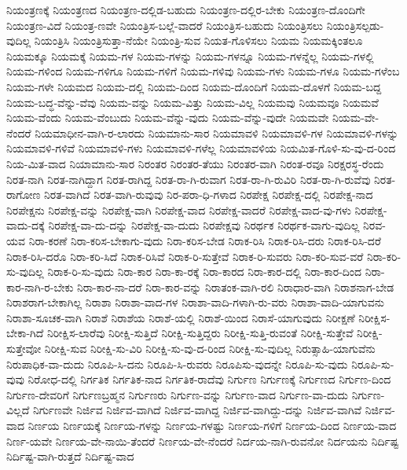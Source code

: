 {ನಿಯಂತ್ರಣಕ್ಕೆ
ನಿಯಂತ್ರಣದ
ನಿಯಂತ್ರಣ-ದಲ್ಲಿಡ-ಬಹುದು
ನಿಯಂತ್ರಣ-ದಲ್ಲಿರ-ಬೇಕು
ನಿಯಂತ್ರಣ-ದೊಂದಿಗೇ
ನಿಯಂತ್ರಣ-ವಿದೆ
ನಿಯಂತ್ರ-ಣವೇ
ನಿಯಂತ್ರಿಸ-ಬಲ್ಲೆ-ವಾದರೆ
ನಿಯಂತ್ರಿಸ-ಬಹುದು
ನಿಯಂತ್ರಿಸಲು
ನಿಯಂತ್ರಿಸಲ್ಪಡು-ವುದಿಲ್ಲ
ನಿಯಂತ್ರಿಸಿ
ನಿಯಂತ್ರಿಸುತ್ತಾ-ನೆಯೇ
ನಿಯಂತ್ರಿ-ಸುವ
ನಿಯತ-ಗೊಳಿಸಲು
ನಿಯಮ
ನಿಯಮಕ್ಕಿಂತಲೂ
ನಿಯಮಕ್ಕೂ
ನಿಯಮಕ್ಕೆ
ನಿಯಮ-ಗಳ
ನಿಯಮ-ಗಳನ್ನು
ನಿಯಮ-ಗಳನ್ನೂ
ನಿಯಮ-ಗಳನ್ನೆಲ್ಲ
ನಿಯಮ-ಗಳಲ್ಲಿ
ನಿಯಮ-ಗಳಿಂದ
ನಿಯಮ-ಗಳಿಗೂ
ನಿಯಮ-ಗಳಿಗೆ
ನಿಯಮ-ಗಳಿವು
ನಿಯಮ-ಗಳು
ನಿಯಮ-ಗಳೂ
ನಿಯಮ-ಗಳೆಂಬ
ನಿಯಮ-ಗಳೇ
ನಿಯಮದ
ನಿಯಮ-ದಲ್ಲಿ
ನಿಯಮ-ದಿಂದ
ನಿಯಮ-ದೊಂದಿಗೆ
ನಿಯಮ-ದೊಳಗೆ
ನಿಯಮ-ಬದ್ದ
ನಿಯಮ-ಬದ್ಧ-ವೆನ್ನು-ವೆವು
ನಿಯಮ-ವನ್ನು
ನಿಯಮ-ವಿತ್ತು
ನಿಯಮ-ವಿಲ್ಲ
ನಿಯಮವು
ನಿಯಮವೂ
ನಿಯಮವೆ
ನಿಯಮ-ವೆಂದು
ನಿಯಮ-ವೆಂಬುದು
ನಿಯಮ-ವೆನ್ನು-ವುದು
ನಿಯಮ-ವೆನ್ನು-ವುದೇ
ನಿಯಮವೇ
ನಿಯಮ-ವೇ-ನೆಂದರೆ
ನಿಯಮಾಧೀನ-ವಾಗಿ-ರ-ಲಾರದು
ನಿಯಮಾನು-ಸಾರ
ನಿಯಮಾವಳಿ
ನಿಯಮಾವಳಿ-ಗಳ
ನಿಯಮಾವಳಿ-ಗಳನ್ನು
ನಿಯಮಾವಳಿ-ಗಳಿವೆ
ನಿಯಮಾವಳಿ-ಗಳು
ನಿಯಮಾವಳಿ-ಗಳೆಲ್ಲ
ನಿಯಮಾವಳಿಯ
ನಿಯಮಿತ-ಗೊಳಿ-ಸು-ವು-ದ-ರಿಂದ
ನಿಯ-ಮಿತ-ವಾದ
ನಿಯಾಮಾನು-ಸಾರ
ನಿರಂತರ
ನಿರಂತರ-ತೆಯು
ನಿರಂತರ-ವಾಗಿ
ನಿರಂತ-ರವೂ
ನಿರಕ್ಷರಸ್ಥ-ರೆಂದು
ನಿರತ-ನಾಗಿ
ನಿರತ-ನಾಗಿದ್ದಾಗ
ನಿರತ-ರಾಗಿದ್ದ
ನಿರತ-ರಾ-ಗಿ-ರುವಾಗ
ನಿರತ-ರಾ-ಗಿ-ರುವಿರಿ
ನಿರತ-ರಾ-ಗಿ-ರುವೆವು
ನಿರತ-ರಾಗೋಣ
ನಿರತ-ವಾಗಿದೆ
ನಿರತ-ವಾಗಿ-ರುವುವು
ನಿರ-ಪರಾ-ಧಿ-ಗಳಾದ
ನಿರಪೇಕ್ಷ
ನಿರಪೇಕ್ಷ-ದಲ್ಲಿ
ನಿರಪೇಕ್ಷ-ನಾದ
ನಿರಪೇಕ್ಷನು
ನಿರಪೇಕ್ಷ-ವನ್ನು
ನಿರಪೇಕ್ಷ-ವಾಗಿ
ನಿರಪೇಕ್ಷ-ವಾದ
ನಿರಪೇಕ್ಷ-ವಾದರೆ
ನಿರಪೇಕ್ಷ-ವಾದ-ವು-ಗಳು
ನಿರಪೇಕ್ಷ-ವಾದು-ದಕ್ಕೆ
ನಿರಪೇಕ್ಷ-ವಾ-ದು-ದನ್ನು
ನಿರಪೇಕ್ಷ-ವಾ-ದುದು
ನಿರಪೇಕ್ಷವು
ನಿರರ್ಥಕ
ನಿರರ್ಥಕ-ವಾಗು-ವುದಿಲ್ಲ
ನಿರವ-ಯವ
ನಿರಾ-ಕರಣೆ
ನಿರಾ-ಕರಿಸ-ಬೇಕಾಗು-ವುದು
ನಿರಾ-ಕರಿಸ-ಬೇಡ
ನಿರಾಕ-ರಿಸಿ
ನಿರಾಕ-ರಿಸಿ-ದರು
ನಿರಾಕ-ರಿಸಿ-ದರೆ
ನಿರಾಕ-ರಿಸಿ-ದರೊ
ನಿರಾ-ಕರಿ-ಸಿದೆ
ನಿರಾಕ-ರಿಸಿವೆ
ನಿರಾಕ-ರಿ-ಸುತ್ತೇವೆ
ನಿರಾಕ-ರಿ-ಸುವರು
ನಿರಾ-ಕರಿ-ಸುವ-ವರೆ
ನಿರಾ-ಕರಿ-ಸು-ವುದಿಲ್ಲ
ನಿರಾಕ-ರಿ-ಸು-ವುದು
ನಿರಾ-ಕಾರ
ನಿರಾ-ಕಾ-ರಕ್ಕೆ
ನಿರಾ-ಕಾರದ
ನಿರಾ-ಕಾರ-ದಲ್ಲಿ
ನಿರಾ-ಕಾರ-ದಿಂದ
ನಿರಾ-ಕಾರ-ನಾಗಿ-ರ-ಬೇಕು
ನಿರಾ-ಕಾರ-ನಾ-ದರೆ
ನಿರಾ-ಕಾರ-ವನ್ನು
ನಿರಾತಂಕ-ವಾಗಿ-ರಲಿ
ನಿರಾಧಾರ-ವಾಗಿ
ನಿರಾಶನಾಗ-ಬೇಡ
ನಿರಾಶರಾಗ-ಬೇಕಾಗಿಲ್ಲ
ನಿರಾಶಾ
ನಿರಾಶಾ-ವಾದ-ಗಳ
ನಿರಾಶಾ-ವಾದಿ-ಗಳಾಗಿ-ರು-ವರು
ನಿರಾಶಾ-ವಾದಿ-ಯಾಗುವನು
ನಿರಾಶಾ-ಸೂಚಕ-ವಾಗಿ
ನಿರಾಶೆ
ನಿರಾಶೆಯ
ನಿರಾಶೆ-ಯಲ್ಲಿ
ನಿರಾಶೆ-ಯಿಂದ
ನಿರಾಸೆ-ಯಾಗುವುದು
ನಿರೀಕ್ಷಣೆ
ನಿರೀಕ್ಷಿಸ-ಬೇಕಾ-ಗಿದೆ
ನಿರೀಕ್ಷಿಸ-ಲಾರೆವು
ನಿರೀಕ್ಷಿ-ಸುತ್ತಿದೆ
ನಿರೀಕ್ಷಿ-ಸುತ್ತಿದ್ದರು
ನಿರೀಕ್ಷಿ-ಸುತ್ತಿ-ರುವಂತೆ
ನಿರೀಕ್ಷಿ-ಸುತ್ತೇವೆ
ನಿರೀಕ್ಷಿ-ಸುತ್ತೇವೋ
ನಿರೀಕ್ಷಿ-ಸುವ
ನಿರೀಕ್ಷಿ-ಸು-ವಿರಿ
ನಿರೀಕ್ಷಿ-ಸು-ವು-ದ-ರಿಂದ
ನಿರೀಕ್ಷಿ-ಸು-ವುದಿಲ್ಲ
ನಿರುತ್ಸಾಹಿ-ಯಾಗುವೆನು
ನಿರುಪಾಧಿಕ-ವಾ-ದುದು
ನಿರೂಪಿ-ಸಿ-ದನು
ನಿರೂಪಿ-ಸಿ-ರುವರು
ನಿರೂಪಿಸು-ವುದನ್ನೇ
ನಿರೂಪಿ-ಸು-ವುದು
ನಿರೂಪಿ-ಸು-ವುವು
ನಿರೋಧ-ದಲ್ಲಿ
ನಿರ್ಗತಿಕ
ನಿರ್ಗತಿಕ-ನಾದ
ನಿರ್ಗತಿಕ-ರಾದೆವು
ನಿರ್ಗುಣ
ನಿರ್ಗುಣಕ್ಕೆ
ನಿರ್ಗುಣದ
ನಿರ್ಗುಣ-ದಿಂದ
ನಿರ್ಗುಣ-ದೇವರಿಗೆ
ನಿರ್ಗುಣಬ್ರಹ್ಮನ
ನಿರ್ಗುಣರು
ನಿರ್ಗುಣ-ವನ್ನು
ನಿರ್ಗುಣ-ವಾದ
ನಿರ್ಗುಣ-ವಾ-ದುದು
ನಿರ್ಗುಣ-ವಿಲ್ಲದೆ
ನಿರ್ಗುಣವೇ
ನಿರ್ಜಿವ
ನಿರ್ಜಿವ-ವಾಗಿದೆ
ನಿರ್ಜಿವ-ವಾಗಿದ್ದ
ನಿರ್ಜಿವ-ವಾಗಿದ್ದು-ದನ್ನು
ನಿರ್ಜಿವ-ವಾಗಿವೆ
ನಿರ್ಜಿವ-ವಾದ
ನಿರ್ಣಯ
ನಿರ್ಣಯಕ್ಕೆ
ನಿರ್ಣಯ-ಗಳನ್ನು
ನಿರ್ಣಯ-ಗಳಷ್ಟು
ನಿರ್ಣಯ-ಗಳಿಗೆ
ನಿರ್ಣಯ-ದಿಂದ
ನಿರ್ಣಯ-ವಾದ
ನಿರ್ಣ-ಯವೇ
ನಿರ್ಣಯ-ವೇ-ನಾಯಿ-ತೆಂದರೆ
ನಿರ್ಣಯ-ವೇ-ನೆಂದರೆ
ನಿರ್ದಯ-ನಾಗಿ-ರುವನೋ
ನಿರ್ದಯನು
ನಿರ್ದಿಷ್ಟ
ನಿರ್ದಿಷ್ಟ-ವಾಗಿ-ರುತ್ತದೆ
ನಿರ್ದಿಷ್ಟ-ವಾದ
}
